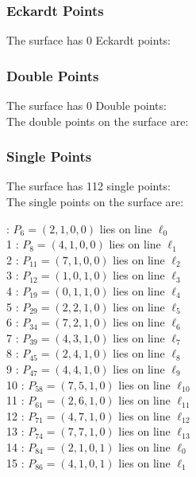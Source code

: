 \documentclass{article}
\begin{document}
{\subsubsection*{Eckardt Points}
The surface has 0 Eckardt points:\\
\subsubsection*{Double Points}
The surface has 0 Double points:\\
The double points on the surface are:\\
\begin{multicols}{2}
\noindent
\end{multicols}
\subsubsection*{Single Points}
The surface has 112 single points:\\
The single points on the surface are:\\
\begin{multicols}{2}
 : $P_{6}=( 2, 1, 0, 0 )$ lies on line $\ell_{0}$\\
1 : $P_{8}=( 4, 1, 0, 0 )$ lies on line $\ell_{1}$\\
2 : $P_{11}=( 7, 1, 0, 0 )$ lies on line $\ell_{2}$\\
3 : $P_{12}=( 1, 0, 1, 0 )$ lies on line $\ell_{3}$\\
4 : $P_{19}=( 0, 1, 1, 0 )$ lies on line $\ell_{4}$\\
5 : $P_{29}=( 2, 2, 1, 0 )$ lies on line $\ell_{5}$\\
6 : $P_{34}=( 7, 2, 1, 0 )$ lies on line $\ell_{6}$\\
7 : $P_{39}=( 4, 3, 1, 0 )$ lies on line $\ell_{7}$\\
8 : $P_{45}=( 2, 4, 1, 0 )$ lies on line $\ell_{8}$\\
9 : $P_{47}=( 4, 4, 1, 0 )$ lies on line $\ell_{9}$\\
10 : $P_{58}=( 7, 5, 1, 0 )$ lies on line $\ell_{10}$\\
11 : $P_{61}=( 2, 6, 1, 0 )$ lies on line $\ell_{11}$\\
12 : $P_{71}=( 4, 7, 1, 0 )$ lies on line $\ell_{12}$\\
13 : $P_{74}=( 7, 7, 1, 0 )$ lies on line $\ell_{13}$\\
14 : $P_{84}=( 2, 1, 0, 1 )$ lies on line $\ell_{0}$\\
15 : $P_{86}=( 4, 1, 0, 1 )$ lies on line $\ell_{1}$\\

\end{multicols}}
\end{document}
